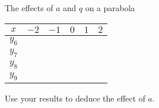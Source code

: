 \begin{Investigation}{The effects of $a$ and $q$ on a parabola}
\begin{table}[H]
  \begin{center}
    \begin{tabular}{|c|c|c|c|c|c|}\hline
      $x$&$-2$&$-1$&$0$&$1$&$2$\\ \hline
      $y_6$ & \hspace{1cm} & \hspace{1cm} & \hspace{1cm} & \hspace{1cm} & \hspace{1cm} \\ \hline
      $y_7$&&&&&\\ \hline
      $y_8$&&&&&\\ \hline
      $y_9$&&&&&\\ \hline
    \end{tabular}
  \end{center}
\end{table}

Use your results to deduce the effect of $a$.
\end{Investigation}

